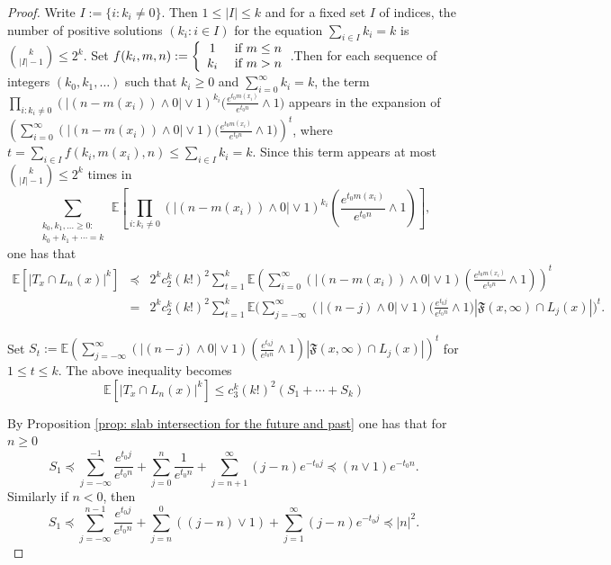 \documentclass[12pt]{article}
\numberwithin{equation}{section}
\newcommand{\be}{\begin{equation}}
\newcommand{\ee}{\end{equation}}
\newcommand{\1}{\mathbf{1}}
\begin{document}
\begin{proof}
Write $I:=\{i\colon k_i\neq 0 \}$. Then $1\leq |I|\leq k$ and for a fixed set $I$ of indices, the number of positive solutions $(k_i\colon i\in I)$ for the equation $\sum_{i\in I}{k_i}=k$ is $\binom{k}{|I|-1}\leq 2^k$. Set $f(k_i,m,n):=\left\{\begin{array}{cc}
1 & \textnormal{ if }m\leq n\\
k_i & \textnormal{ if }m>n
\end{array}\right.$.Then for each  sequence of integers $(k_0,k_1,\ldots)$ such that $k_i\geq0$ and $\sum_{i=0}^{\infty}k_i=k$, the term $ \prod_{i:k_i\neq 0} 
(|(n-m(x_i))\wedge0|\vee 1)^{k_i}\big(\frac{e^{t_0m(x_i)}}{e^{t_0n}}\wedge1\big)$ appears in the expansion of $\left(
\sum_{i=0}^{\infty}(|(n-m(x_i))\wedge0|\vee 1)\big(\frac{e^{t_0m(x_i)}}{e^{t_0n}}\wedge1\big)
\right)^t$, where $t=\sum_{i\in I}{f(k_i,m(x_i),n)}\leq \sum_{i\in I}{k_i}=k$. Since  this term appears at most $\binom{k}{|I|-1}\leq 2^k$ times in $$\sum_{\substack{k_0,k_1,\ldots \geq 0:\\ k_0+ k_1+\cdots  =k}} \,\mathbb{E}\left[ \prod_{i:k_i\neq 0} 
(|(n-m(x_i))\wedge0|\vee 1)^{k_i}\left(\frac{e^{t_0m(x_i)}}{e^{t_0n}}\wedge1\right)\right],$$ one has that 
\begin{eqnarray*}\label{eq: 4.49' in terms of S_t}
\mathbb{E}[|T_x\cap L_n(x)|^k]
&\preceq&2^kc_{2}^k(k!)^2\sum_{t=1}^{k}\mathbb{E}\left(
\sum_{i=0}^{\infty}(|(n-m(x_i))\wedge0|\vee 1)\left(\frac{e^{t_0m(x_i)}}{e^{t_0n}}\wedge1\right)
\right)^t\nonumber\\
&=&2^kc_{2}^k(k!)^2\sum_{t=1}^{k}\mathbb{E}\bigg(\sum_{j=-\infty}^{\infty} (|(n-j)\wedge0|\vee1)\big(\frac{e^{t_0j}}{e^{t_0n}}\wedge1\big)|\mathfrak{F}(x,\infty)\cap L_j(x)| \bigg)^t.
\end{eqnarray*} 


	
Set $S_t:=\mathbb{E}\left(\sum_{j=-\infty}^{\infty} (|(n-j)\wedge0|\vee1)\left(\frac{e^{t_0j}}{e^{t_0n}}\wedge1\right)|\mathfrak{F}(x,\infty)\cap L_j(x)| \right)^t$ for $1\leq t\leq k$. 
The above inequality becomes 
\be\label{eq: bound k-th moment of T_x intersect with L_n(x) in terms of S_t}
\mathbb{E}[|T_x\cap L_n(x)|^k]\leq c_{3}^k(k!)^2(S_1+\cdots+S_k)
\ee

By Proposition \ref{prop: slab intersection for the future and past} one has that for $n\geq 0$
\be\label{eq: bound S_1 when n geq 0}
S_1\preceq \sum_{j=-\infty}^{-1}\frac{e^{t_0j}}{e^{t_0n}}+
\sum_{j=0}^{n}\frac{1}{e^{t_0n}}+\sum_{j=n+1}^{\infty}(j-n)e^{-t_0j} 
\preceq (n\vee 1)e^{-t_0n}.
\ee
Similarly if $n<0$, then 
\be\label{eq: bound S_1 when n leq 0}
S_1\preceq \sum_{j=-\infty}^{n-1}\frac{e^{t_0j}}{e^{t_0n}}+\sum_{j=n}^{0}((j-n)\vee 1)+
\sum_{j=1}^{\infty}(j-n)e^{-t_0j}\preceq|n|^2.
\ee	
	

\end{proof}
\end{document}
